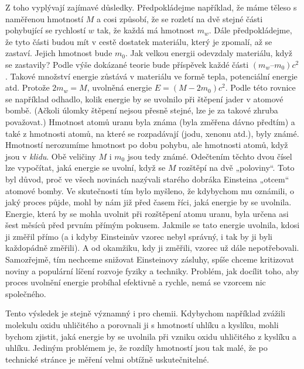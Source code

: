 {{    Z toho vyplývají zajímavé důsledky. Předpokládejme například, že máme těleso s naměřenou 
    hmotností \(M\) a cosi způsobí, že se rozletí na dvě stejné části pohybující se rychlostí \(w\) 
    tak, že každá má hmotnost \(m_w\). Dále předpokládejme, že tyto části budou mít v cestě 
    dostatek materiálu, který je zpomalí, až se zastaví. Jejich hmotnost bude \(m_0\). Jak velkou 
    energii odevzdaly materiálu, když se zastavily? Podle výše dokázané teorie bude příspěvek každé 
    části \((m_w – m_0)c^2\). Takové množství energie zůstává v materiálu ve formě tepla, 
    potenciální energie atd. Protože \(2m_w = M\), uvolněná energie \(E = (M - 2m_0)c^2\). Podle 
    této rovnice se například odhadlo, kolik energie by se uvolnilo při štěpení jader v atomové 
    bombě. (Ačkoli úlomky štěpení nejsou přesně stejné, lze je za takové zhruba považovat.) 
    Hmotnost atomů uranu byla známa (byla změřena dávno předtím) a také z hmotnosti atomů, na které 
    se rozpadávají (jodu, xenonu atd.), byly známé. Hmotností nerozumíme hmotnost po dobu pohybu, 
    ale hmotnosti atomů, když jsou v \emph{klidu}. Obě veličiny \(M\) i \(m_0\) jsou tedy známé. 
    Odečtením těchto dvou čísel lze vypočítat, jaká energie se uvolní, když se \(M\) rozštěpí na 
    dvě „poloviny“. Toto byl důvod, proč ve všech novinách nazývali starého dobráka Einsteina 
    „otcem“ atomové bomby. Ve skutečnosti tím bylo myšleno, že kdybychom mu oznámili, o jaký proces 
    půjde, mohl by nám již před časem říci, jaká energie by se uvolnila. Energie, která by se mohla 
    uvolnit při rozštěpení atomu uranu, byla určena asi šest měsíců před prvním přímým pokusem. 
    Jakmile se tato energie uvolnila, kdosi ji změřil přímo (a i kdyby Einsteinův vzorec nebyl 
    správný, i tak by ji byli každopádně změřili). A od okamžiku, kdy ji změřili, vzorec už dále 
    nepotřebovali. Samozřejmě, tím nechceme snižovat Einsteinovy zásluhy, spíše chceme kritizovat 
    noviny a populární líčení rozvoje fyziky a techniky. Problém, jak docílit toho, aby proces 
    uvolnění energie probíhal efektivně a rychle, nemá se vzorcem nic společného.
    
    Tento výsledek je stejně významný i pro chemii. Kdybychom například zvážili molekulu oxidu 
    uhličitého a porovnali ji s hmotností uhlíku a kyslíku, mohli bychom zjistit, jaká energie by 
    se uvolnila při vzniku oxidu uhličitého z kyslíku a uhlíku. Jediným problémem je, že rozdíly 
    hmotností jsou tak malé, že po technické stránce je měření velmi obtížně uskutečnitelné.
    
}}
